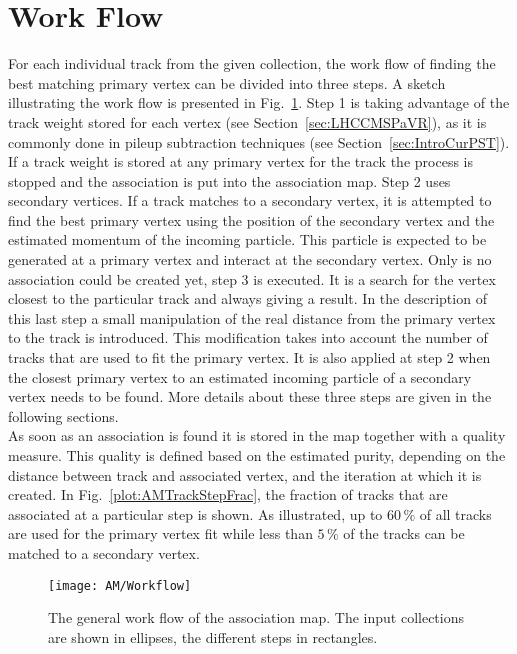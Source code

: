 \section{Work Flow \label{sec:AMWorkflow}}

For each individual track from the given collection, the work flow of finding the best matching primary vertex can be divided into three steps. A sketch illustrating the work flow is presented in Fig.~\ref{plot:AMWorkSketch}. Step 1 is taking advantage of the track weight stored for each vertex (see Section~\ref{sec:LHCCMSPaVR}), as it is commonly done in pileup subtraction techniques (see Section~\ref{sec:IntroCurPST}). If a track weight is stored at any primary vertex for the track the process is stopped and the association is put into the association map. Step 2 uses secondary vertices. If a track matches to a secondary vertex, it is attempted to find the best primary vertex using the position of the secondary vertex and the estimated momentum of the incoming particle. This particle is expected to be generated at a primary vertex and interact at the secondary vertex. Only is no association could be created yet, step 3 is executed. It is a search for the vertex closest to the particular track and always giving a result. In the description of this last step a small manipulation of the real distance from the primary vertex to the track is introduced. This modification takes into account the number of tracks that are used to fit the primary vertex. It is also applied at step 2 when the closest primary vertex to an estimated incoming particle of a secondary vertex needs to be found. More details about these three steps are given in the following sections.  \\
As soon as an association is found it is stored in the map together with a quality measure. This quality is defined based on the estimated purity, depending on the distance between track and associated vertex, and the iteration at which it is created. In Fig.~\ref{plot:AMTrackStepFrac}, the fraction of tracks that are associated at a particular step is shown. As illustrated, up to $60\,\%$ of all tracks are used for the primary vertex fit while less than $5\,\%$ of the tracks can be matched to a secondary vertex.

\begin{figure}[Ht]
    \centering
    \texttt{[image: AM/Workflow]}
    \caption[Sketch of the work flow of the association map]{The general work flow of the association map. The input collections are shown in ellipses, the different steps in rectangles. \label{plot:AMWorkSketch}}
\end{figure}

